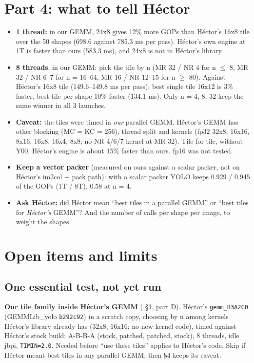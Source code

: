 \section{Part 4: what to tell H\'ector}
\begin{itemize}\setlength\itemsep{2pt}
\item \textbf{1 thread:} in our GEMM, 24x8 gives 12\% more GOPs than H\'ector's 16x8 tile over the 50 shapes (698.6 against 785.3 ms per pass). H\'ector's own engine at 1T is faster than ours (583.3 ms), and 24x8 is not in H\'ector's library.
\item \textbf{8 threads}, in our GEMM: pick the tile by n (MR 32 / NR 4 for n $\le$ 8, MR 32 / NR 6--7 for n = 16--64, MR 16 / NR 12--15 for n $\ge$ 80). Against H\'ector's 16x8 tile (149.6--149.8 ms per pass): best single tile 16x12 is 3\% faster, best tile per shape 10\% faster (134.1 ms). Only n = 4, 8, 32 keep the same winner in all 3 launches.
\item \textbf{Caveat:} the tiles were timed in \emph{our} parallel GEMM. H\'ector's GEMM has other blocking (MC = KC = 256), thread split and kernels (fp32 32x8, 16x16, 8x16, 16x8, 16x4, 8x8; no NR 4/6/7 kernel at MR 32). Tile for tile, without Y00, H\'ector's engine is about 15\% faster than ours. fp16 was not tested.
\item \textbf{Keep a vector packer} (measured on ours against a scalar packer, not on H\'ector's im2col + pack path): with a scalar packer YOLO keeps 0.929 / 0.945 of the GOPs (1T / 8T), 0.58 at n = 4.
\item \textbf{Ask H\'ector:} did H\'ector mean ``best tiles in a parallel GEMM'' or ``best tiles for \emph{H\'ector's} GEMM''? And the number of calls per shape per image, to weight the shapes.
\end{itemize}

\section{Open items and limits}\label{sec:open}
\subsection*{One essential test, not yet run}
\textbf{Our tile family inside H\'ector's GEMM} ( \S1,  part D). H\'ector's \texttt{gemm\_B3A2C0} (GEMMLib\_yolo \texttt{b292c92}) in a scratch copy, choosing by n among kernels H\'ector's library already has (32x8, 16x16; no new kernel code), timed against H\'ector's stock build: A-B-B-A (stock, patched, patched, stock), 8 threads, idle jbpi, \texttt{TIMIN=2.0}. Needed before ``use these tiles'' applies to H\'ector's code. Skip if H\'ector meant best tiles in any parallel GEMM; then \S4 keeps its caveat.

